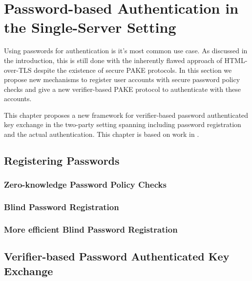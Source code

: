 \chapter{Password-based Authentication in the Single-Server Setting} \label{ch:vpake}
Using passwords for authentication is it's most common use case.
As discussed in the introduction, this is still done with the inherently flawed approach of \ac{HTML}-over-\ac{TLS} despite the existence of secure \ac{PAKE} protocols.
In this section we propose new mechanisms to register user accounts with secure password policy checks and give a new verifier-based \ac{PAKE} protocol to authenticate with these accounts.

This chapter proposes a new framework for verifier-based password authenticated key exchange in the two-party setting spanning including password registration and the actual authentication.
This chapter is based on work in \cite{Kiefer13a,Kiefer2012,KieferM14b,KieferM15a,DongK15a,ManulisSKD15a}.

\section{Registering Passwords} \label{sec:vpake-registration}

\subsection{Zero-knowledge Password Policy Checks}

\subsection{Blind Password Registration}

\subsection{More efficient Blind Password Registration}

\section{Verifier-based Password Authenticated Key Exchange} \label{sec:vpake-pake}

